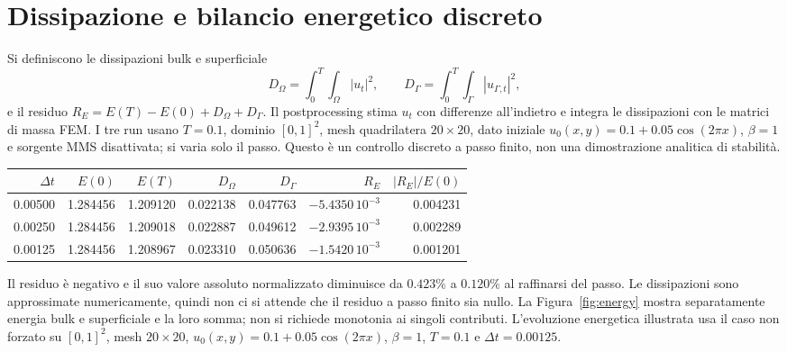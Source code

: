 \documentclass[10pt,a4paper]{article}
\begin{document}
\section{Dissipazione e bilancio energetico discreto}
Si definiscono le dissipazioni bulk e superficiale
\[
 D_\Omega=\int_0^T\!\int_\Omega|u_t|^2,\qquad
 D_\Gamma=\int_0^T\!\int_\Gamma|u_{\Gamma,t}|^2,
\]
e il residuo $R_E=E(T)-E(0)+D_\Omega+D_\Gamma$. Il postprocessing stima $u_t$ con differenze all'indietro e integra le dissipazioni con le matrici di massa FEM. I tre run usano $T=0.1$, dominio $[0,1]^2$, mesh quadrilatera $20\times20$, dato iniziale $u_0(x,y)=0.1+0.05\cos(2\pi x)$, $\beta=1$ e sorgente MMS disattivata; si varia solo il passo. Questo è un controllo discreto a passo finito, non una dimostrazione analitica di stabilità.
\begin{center}\small
\begin{tabular}{rrrrrrr}
\toprule
$\Delta t$&$E(0)$&$E(T)$&$D_\Omega$&$D_\Gamma$&$R_E$&$|R_E|/E(0)$\\
\midrule
0.00500&1.284456&1.209120&0.022138&0.047763&$-5.4350\,10^{-3}$&0.004231\\
0.00250&1.284456&1.209018&0.022887&0.049612&$-2.9395\,10^{-3}$&0.002289\\
0.00125&1.284456&1.208967&0.023310&0.050636&$-1.5420\,10^{-3}$&0.001201\\
\bottomrule
\end{tabular}
\end{center}
Il residuo è negativo e il suo valore assoluto normalizzato diminuisce da $0.423\%$ a $0.120\%$ al raffinarsi del passo. Le dissipazioni sono approssimate numericamente, quindi non ci si attende che il residuo a passo finito sia nullo. La Figura~\ref{fig:energy} mostra separatamente energia bulk e superficiale e la loro somma; non si richiede monotonia ai singoli contributi. L'evoluzione energetica illustrata usa il caso non forzato su $[0,1]^2$, mesh $20\times20$, $u_0(x,y)=0.1+0.05\cos(2\pi x)$, $\beta=1$, $T=0.1$ e $\Delta t=0.00125$.
\end{document}
